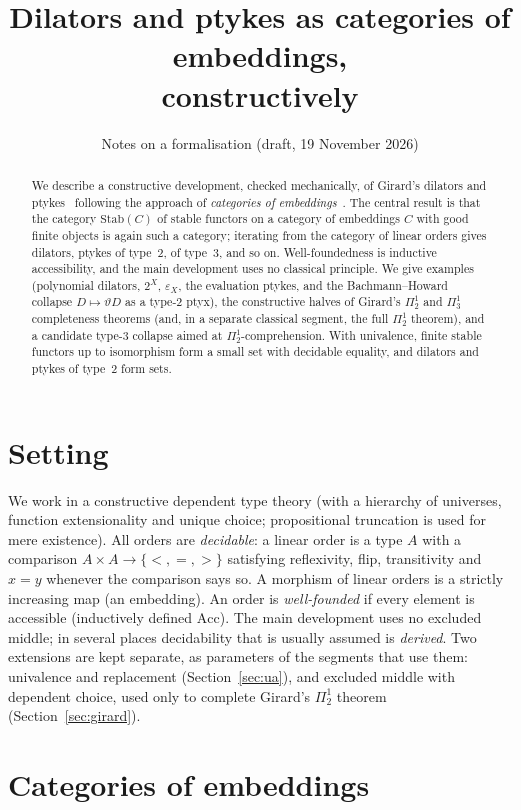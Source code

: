 \documentclass[11pt]{article}
\title{Dilators and ptykes as categories of embeddings,\\ constructively}
\author{Notes on a formalisation (draft, 19 November 2026)}
\date{}
\theoremstyle{definition}
\theoremstyle{remark}
\newcommand{\Stab}{\mathrm{Stab}}
\newcommand{\Acc}{\mathrm{Acc}}
\begin{document}
\maketitle

\begin{abstract}
We describe a constructive development, checked mechanically, of Girard's
dilators and ptykes~\cite{Gir81,GirPTLC} following the approach of
\emph{categories of embeddings}~\cite{Coq89}. The central result is that the category
$\Stab(C)$ of stable functors on a category of embeddings $C$ with good
finite objects is again such a category; iterating from the category of
linear orders gives dilators, ptykes of type~2, of type~3, and so on.
Well-foundedness is inductive accessibility, and the main development uses
no classical principle. We give examples (polynomial dilators, $2^X$, $\varepsilon_X$, the
evaluation ptykes, and the Bachmann--Howard collapse $D\mapsto\vartheta D$
as a type-2 ptyx), the constructive halves of Girard's $\Pi^1_2$ and
$\Pi^1_3$ completeness theorems (and, in a separate classical segment, the
full $\Pi^1_2$ theorem), and a candidate type-3 collapse aimed at
$\Pi^1_2$-comprehension. With univalence, finite stable functors up to
isomorphism form a small set with decidable equality, and dilators and
ptykes of type~2 form sets.
\end{abstract}

\section{Setting}

We work in a constructive dependent type theory (with a hierarchy of
universes, function extensionality and unique choice; propositional
truncation is used for mere existence).  All
orders are \emph{decidable}: a linear order is a type $A$ with a
comparison $A\times A\to\{<,=,>\}$ satisfying reflexivity, flip,
transitivity and $x=y$ whenever the comparison says so.  A morphism of
linear orders is a strictly increasing map (an embedding).  An order is
\emph{well-founded} if every element is accessible (inductively defined
$\Acc$).  The main development uses no excluded middle; in several places
decidability that is usually assumed is \emph{derived}. Two extensions are
kept separate, as parameters of the segments that use them: univalence and
replacement (Section~\ref{sec:ua}), and excluded middle with dependent
choice, used only to complete Girard's $\Pi^1_2$ theorem
(Section~\ref{sec:girard}).

\section{Categories of embeddings}
\end{document}
